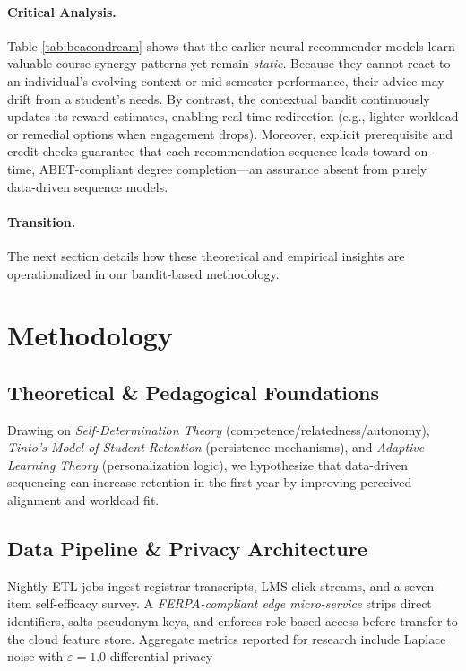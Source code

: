 \documentclass[conference]{IEEEtran}
\begin{document}
\paragraph*{Critical Analysis.}
Table \ref{tab:beacondream} shows that the earlier neural recommender models learn valuable course-synergy patterns yet remain \emph{static}.  
Because they cannot react to an individual’s evolving context or mid-semester performance, their advice may drift from a student’s needs.  
By contrast, the contextual bandit continuously updates its reward estimates, enabling real-time redirection (e.g., lighter workload or remedial options when engagement drops).  
Moreover, explicit prerequisite and credit checks guarantee that each recommendation sequence leads toward on-time, ABET-compliant degree completion—an assurance absent from purely data-driven sequence models.

\paragraph*{Transition.}
The next section details how these theoretical and empirical insights are operationalized in our bandit-based methodology.


\section{Methodology}
\subsection{Theoretical \& Pedagogical Foundations}
Drawing on \emph{Self-Determination Theory} (competence/relatedness/autonomy),
\emph{Tinto’s Model of Student Retention} (persistence mechanisms),
and \emph{Adaptive Learning Theory} (personalization logic), we hypothesize that data-driven sequencing can increase retention in the first year by improving perceived alignment and workload fit.

\subsection{Data Pipeline \& Privacy Architecture}
Nightly ETL jobs ingest registrar transcripts, LMS click-streams, and a seven-item self-efficacy survey.
A \emph{FERPA-compliant edge micro-service} strips direct identifiers,
salts pseudonym keys, and enforces role-based access before transfer to the cloud feature store.
Aggregate metrics reported for research include Laplace noise with
$\varepsilon=1.0$ differential privacy
\end{document}
